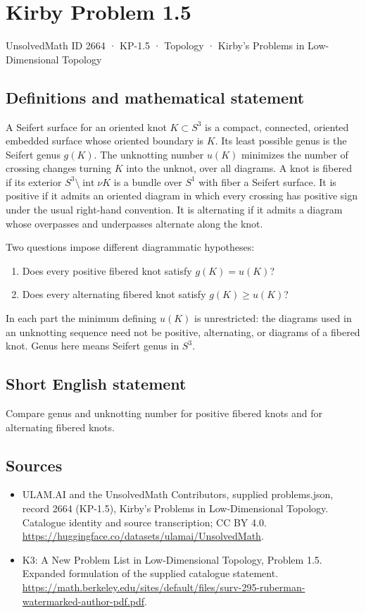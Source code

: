 \documentclass[11pt,a4paper]{article}
\begin{document}
\section*{Kirby Problem 1.5}\label{2664}
{\small UnsolvedMath ID 2664 · KP-1.5 · Topology · Kirby's Problems in Low-Dimensional Topology}
\subsection{Definitions and mathematical statement}
A Seifert surface for an oriented knot $K\subset S^3$ is a compact, connected,
oriented embedded surface whose oriented boundary is $K$. Its least possible genus
is the Seifert genus $g(K)$. The unknotting number $u(K)$ minimizes the number of
crossing changes turning $K$ into the unknot, over all diagrams.
A knot is fibered if its exterior $S^3\setminus\operatorname{int}\nu K$ is a bundle
over $S^1$ with fiber a Seifert surface. It is positive if it admits an oriented
diagram in which every crossing has positive sign under the usual right-hand
convention. It is alternating if it admits a diagram whose overpasses and
underpasses alternate along the knot.

Two questions impose different diagrammatic hypotheses:
\begin{enumerate}
\item Does every positive fibered knot satisfy $g(K)=u(K)$?
\item Does every alternating fibered knot satisfy $g(K)\geq u(K)$?
\end{enumerate}
In each part the minimum defining $u(K)$ is unrestricted: the diagrams used in an
unknotting sequence need not be positive, alternating, or diagrams of a fibered
knot. Genus here means Seifert genus in $S^3$.
\subsection{Short English statement}
Compare genus and unknotting number for positive fibered knots and for alternating fibered knots.
\subsection{Sources}
\begin{itemize}
\item[S1] ULAM.AI and the UnsolvedMath Contributors, supplied problems.json, record 2664 (KP-1.5), Kirby's Problems in Low-Dimensional Topology. Catalogue identity and source transcription; CC BY 4.0.
\url{https://huggingface.co/datasets/ulamai/UnsolvedMath}.
\item[S2] K3: A New Problem List in Low-Dimensional Topology, Problem 1.5. Expanded formulation of the supplied catalogue statement.
\url{https://math.berkeley.edu/sites/default/files/surv-295-ruberman-watermarked-author-pdf.pdf}.
\end{itemize}
\end{document}
